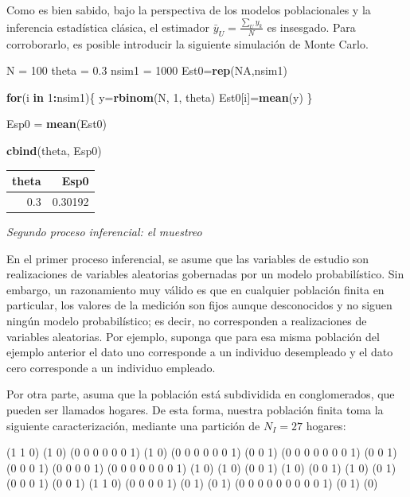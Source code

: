 \documentclass[
  spanish,
  12pt,
]{book}
\newenvironment{Shaded}{\begin{snugshade}}{\end{snugshade}}
\newcommand{\ConstantTok}[1]{\textcolor[rgb]{0.56,0.35,0.01}{#1}}
\newcommand{\ControlFlowTok}[1]{\textcolor[rgb]{0.13,0.29,0.53}{\textbf{#1}}}
\newcommand{\DecValTok}[1]{\textcolor[rgb]{0.00,0.00,0.81}{#1}}
\newcommand{\FloatTok}[1]{\textcolor[rgb]{0.00,0.00,0.81}{#1}}
\newcommand{\FunctionTok}[1]{\textcolor[rgb]{0.13,0.29,0.53}{\textbf{#1}}}
\newcommand{\NormalTok}[1]{#1}
\newcommand{\OtherTok}[1]{\textcolor[rgb]{0.56,0.35,0.01}{#1}}
\newcommand{\SpecialCharTok}[1]{\textcolor[rgb]{0.81,0.36,0.00}{\textbf{#1}}}
\begin{document}
Como es bien sabido, bajo la perspectiva de los modelos poblacionales y la inferencia estadística clásica, el estimador \(\bar{y}_U = \frac{\sum_U y_k}{N}\) es insesgado. Para corroborarlo, es posible introducir la siguiente simulación de Monte Carlo.

\begin{Shaded}
\begin{Highlighting}[]
\NormalTok{N }\OtherTok{=} \DecValTok{100}
\NormalTok{theta }\OtherTok{=} \FloatTok{0.3}
\NormalTok{nsim1 }\OtherTok{=} \DecValTok{1000}
\NormalTok{Est0}\OtherTok{=}\FunctionTok{rep}\NormalTok{(}\ConstantTok{NA}\NormalTok{,nsim1)}

\ControlFlowTok{for}\NormalTok{(i }\ControlFlowTok{in} \DecValTok{1}\SpecialCharTok{:}\NormalTok{nsim1)\{}
\NormalTok{y}\OtherTok{=}\FunctionTok{rbinom}\NormalTok{(N, }\DecValTok{1}\NormalTok{, theta)}
\NormalTok{Est0[i]}\OtherTok{=}\FunctionTok{mean}\NormalTok{(y)}
\NormalTok{\}}

\NormalTok{Esp0 }\OtherTok{=} \FunctionTok{mean}\NormalTok{(Est0)}

\FunctionTok{cbind}\NormalTok{(theta, Esp0)  }
\end{Highlighting}
\end{Shaded}

\begin{tabular}{r|r}
\hline
theta & Esp0\\
\hline
0.3 & 0.30192\\
\hline
\end{tabular}

\emph{Segundo proceso inferencial: el muestreo}

En el primer proceso inferencial, se asume que las variables de estudio son realizaciones de variables aleatorias gobernadas por un modelo probabilístico. Sin embargo, un razonamiento muy válido es que en cualquier población finita en particular, los valores de la medición son fijos aunque desconocidos y no siguen ningún modelo probabilístico;
es decir, no corresponden a realizaciones de variables aleatorias. Por ejemplo, suponga que para esa misma población del ejemplo anterior el dato uno corresponde a un individuo desempleado y el dato cero corresponde a un individuo empleado.

Por otra parte, asuma que la población está subdividida en conglomerados, que pueden ser llamados hogares. De esta forma, nuestra población finita toma la siguiente caracterización, mediante una partición de \(N_{I}=27\) hogares:

(1 1 0) (1 0) (0 0 0 0 0 0 1) (1 0) (0 0 0 0 0 0 1) (0 0
1) (0 0 0 0 0 0 0 1) (0 0 1) (0 0 0 1) (0 0 0 0 1) (0 0
0 0 0 0 0 1) (1 0) (1 0) (0 0 1) (1 0) (0 0 1) (1 0) (0 1)
(0 0 0 1) (0 0 1) (1 1 0) (0 0 0 0 1) (0 1) (0 1) (0 0 0 0
0 0 0 0 0 1) (0 1) (0)
\end{document}
